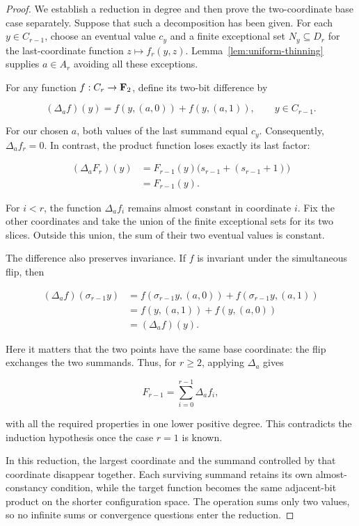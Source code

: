 \begin{proof}
We establish a reduction in degree and then prove the two-coordinate
base case separately.  Suppose that such a decomposition has been given.
For each \(y\in C_{r-1}\), choose an eventual value \(c_y\) and a finite
exceptional set \(N_y\subseteq D_r\) for the last-coordinate function
\(z\mapsto f_r(y,z)\).  Lemma~\ref{lem:uniform-thinning} supplies
\(a\in A_r\) avoiding all these exceptions.

For any function \(f:C_r\to\mathbf F_2\), define its two-bit difference by

\[
(\Delta_a f)(y)=f(y,(a,0))+f(y,(a,1)),
\qquad y\in C_{r-1}.
\]

For our chosen \(a\), both values of the last summand equal \(c_y\).
Consequently, \(\Delta_a f_r=0\).  In contrast, the product function
loses exactly its last factor:

\[
\begin{aligned}
(\Delta_a F_r)(y)
&=F_{r-1}(y)\bigl(s_{r-1}+(s_{r-1}+1)\bigr)\\
&=F_{r-1}(y).
\end{aligned}
\]

For \(i<r\), the function \(\Delta_a f_i\) remains almost constant in
coordinate \(i\).  Fix the other coordinates and take the union of the
finite exceptional sets for its two slices.  Outside this union, the sum
of their two eventual values is constant.

The difference also preserves invariance.  If \(f\) is invariant under
the simultaneous flip, then

\[
\begin{aligned}
(\Delta_a f)(\sigma_{r-1}y)
&=f(\sigma_{r-1}y,(a,0))+f(\sigma_{r-1}y,(a,1))\\
&=f(y,(a,1))+f(y,(a,0))\\
&=(\Delta_a f)(y).
\end{aligned}
\]

Here it matters that the two points have the same base coordinate:
the flip exchanges the two summands.  Thus, for \(r\geq2\), applying
\(\Delta_a\) gives

\[
F_{r-1}=\sum_{i=0}^{r-1}\Delta_a f_i,
\]

with all the required properties in one lower positive degree.  This
contradicts the induction hypothesis once the case \(r=1\) is known.

In this reduction, the largest coordinate and the summand controlled by
that coordinate disappear together.  Each surviving summand retains its
own almost-constancy condition, while the target function becomes the
same adjacent-bit product on the shorter configuration space.  The
operation sums only two values, so no infinite sums or convergence
questions enter the reduction.


\end{proof}
